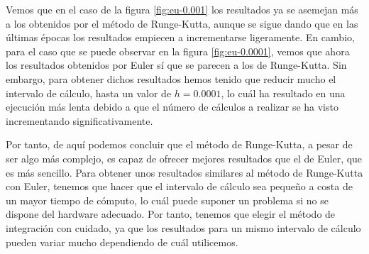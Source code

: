 \documentclass[11pt,a4paper]{article}
\begin{document}
Vemos que en el caso de la figura \ref{fig:eu-0.001} los resultados ya se asemejan más
a los obtenidos por el método de Runge-Kutta, aunque se sigue dando que en las últimas
épocas los resultados empiecen a incrementarse ligeramente. En cambio, para el caso
que se puede observar en la figura \ref{fig:eu-0.0001}, vemos que ahora los resultados
obtenidos por Euler sí que se parecen a los de Runge-Kutta. Sin embargo, para obtener
dichos resultados hemos tenido que reducir mucho el intervalo de cálculo, hasta un
valor de $h = 0.0001$, lo cuál ha resultado en una ejecución más lenta debido
a que el número de cálculos a realizar se ha visto incrementando significativamente.

Por tanto, de aquí podemos concluir que el método de Runge-Kutta, a pesar de ser algo
más complejo, es capaz de ofrecer mejores resultados que el de Euler, que es más sencillo.
Para obtener unos resultados similares al método de Runge-Kutta con Euler, tenemos que
hacer que el intervalo de cálculo sea pequeño a costa de un mayor tiempo de cómputo,
lo cuál puede suponer un problema si no se dispone del hardware adecuado. Por tanto,
tenemos que elegir el método de integración con cuidado, ya que los resultados para
un mismo intervalo de cálculo pueden variar mucho dependiendo de cuál utilicemos.
\end{document}
